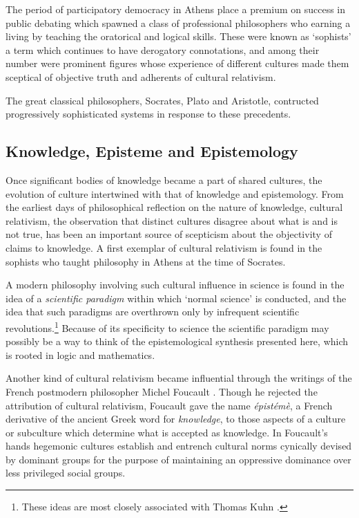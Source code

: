 \documentclass[10pt,titlepage]{book}
\begin{document}
The period of participatory democracy in Athens place a premium on success in public debating which spawned a class of professional philosophers who earning a living by teaching the oratorical and logical skills.
These were known as `sophists' a term which continues to have derogatory connotations, and among their number were prominent figures whose experience of different cultures made them sceptical of objective truth and adherents of cultural relativism.

The great classical philosophers, Socrates, Plato and Aristotle, contructed progressively sophisticated systems in response to these precedents.





\subsection{Knowledge, Episteme and Epistemology}

Once significant bodies of knowledge became a part of shared cultures, the evolution of culture intertwined with that of knowledge and epistemology.
From the earliest days of philosophical reflection on the nature of knowledge, cultural relativism, the observation that distinct cultures disagree about what is and is not true, has been an important source of scepticism about the objectivity of claims to knowledge.
A first exemplar of cultural relativism is found in the sophists who taught philosophy in Athens at the time of Socrates.

A modern philosophy involving such cultural influence in science is found in the idea of a \emph{scientific paradigm} within which `normal science' is conducted, and the idea that such paradigms are overthrown only by infrequent scientific revolutions.\footnote{These ideas are most closely associated with Thomas Kuhn \cite{kuhn2012structure,kuhn2000structure}.}
Because of its specificity to science the scientific paradigm may possibly be a way to think of the epistemological synthesis presented here, which is rooted in logic and mathematics.

Another kind of cultural relativism became influential through the writings of the French postmodern philosopher Michel Foucault \cite{foucault1966order}.
Though he rejected the attribution of cultural relativism, Foucault gave the name \emph{épistémè}, a French derivative of the ancient Greek word for \emph{knowledge}, to those aspects of a culture or subculture which determine what is accepted as knowledge.
In Foucault's hands hegemonic cultures establish and entrench cultural norms cynically devised by dominant groups for the purpose of maintaining an oppressive dominance over less privileged social groups.
\end{document}
